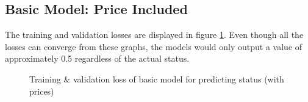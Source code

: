 \documentclass[12pt,twoside]{report}
\begin{document}
\subsection{Basic Model: Price Included}
\label{basic_status_training_included}
The training and validation losses are displayed in figure \ref{basic_status}. Even though all the losses can converge from these graphs, the models would only output a value of approximately 0.5 regardless of the actual status.
\\

\begin{figure}[!htbp]
	\centering
	\hfill
	\hfill
	\hfil
	\hfil
	\caption{Training \& validation loss of basic model for predicting status (with prices)}
	\label{basic_status}
\end{figure}
\end{document}
